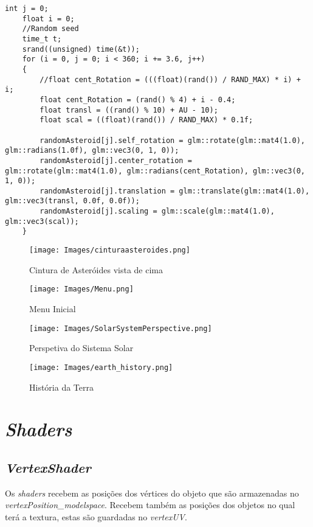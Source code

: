 \begin{lstlisting}[caption=\textit{ Excerto de código para a criação da cintura de Asteroides}.]
    int j = 0;
    float i = 0;
    //Random seed
    time_t t;
    srand((unsigned) time(&t));
    for (i = 0, j = 0; i < 360; i += 3.6, j++)
    {
        //float cent_Rotation = (((float)(rand()) / RAND_MAX) * i) + i;
        float cent_Rotation = (rand() % 4) + i - 0.4;
        float transl = ((rand() % 10) + AU - 10);
        float scal = ((float)(rand()) / RAND_MAX) * 0.1f;

        randomAsteroid[j].self_rotation = glm::rotate(glm::mat4(1.0), glm::radians(1.0f), glm::vec3(0, 1, 0));
        randomAsteroid[j].center_rotation = glm::rotate(glm::mat4(1.0), glm::radians(cent_Rotation), glm::vec3(0, 1, 0));
        randomAsteroid[j].translation = glm::translate(glm::mat4(1.0), glm::vec3(transl, 0.0f, 0.0f));
        randomAsteroid[j].scaling = glm::scale(glm::mat4(1.0), glm::vec3(scal));
    }
\end{lstlisting}

\begin{figure}[H]
    \centering
    \texttt{[image: Images/cinturaasteroides.png]}
    \caption{Cintura de Asteróides vista de cima}
    \label{fig:label}
\end{figure}


\begin{figure}[H]
    \centering
    \texttt{[image: Images/Menu.png]}
    \caption{Menu Inicial}
    \label{fig:label}
\end{figure}

\begin{figure}[H]
    \centering
    \texttt{[image: Images/SolarSystemPerspective.png]}
    \caption{Perspetiva do Sistema Solar}
    \label{fig:label}
\end{figure}

\begin{figure}[H]
    \centering
    \texttt{[image: Images/earth\_history.png]}
    \caption{História da Terra}
    \label{fig:label}
\end{figure}

\section{\textit{Shaders}}
\subsection{\textit{VertexShader}}
Os \textit{shaders} recebem as posições dos vértices do objeto que são armazenadas no \textit{vertexPosition\_modelspace}. Recebem também as posições dos objetos no qual terá a textura, estas são guardadas no \textit{vertexUV}.

